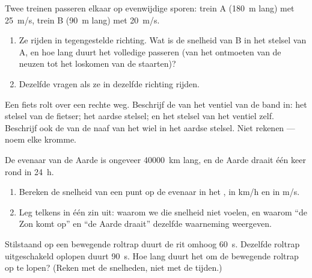 \begin{exercise}[$\star\star$]\label{exo:g10:relative-motion:8}
Twee treinen passeren elkaar op evenwijdige sporen: trein A
(\qty{180}{m} lang) met \qty{25}{m/s}, trein B (\qty{90}{m} lang) met
\qty{20}{m/s}.
\begin{enumerate}
  \item Ze rijden in tegengestelde richting. Wat is de snelheid van B in
        het stelsel van A, en hoe lang duurt het volledige passeren (van
        het ontmoeten van de neuzen tot het loskomen van de staarten)?
  \item Dezelfde vragen als ze in dezelfde richting rijden.
\end{enumerate}
\end{exercise}

\begin{exercise}[$\star\star$]\label{exo:g10:relative-motion:9}
Een fiets rolt over een rechte weg. Beschrijf de  van het ventiel van
de band in: het stelsel van de fietser; het aardse stelsel; en het
stelsel van het ventiel zelf. Beschrijf ook de  van de naaf van het
wiel in het aardse stelsel. Niet rekenen --- noem elke kromme.
\end{exercise}

\begin{exercise}[$\star\star$]\label{exo:g10:relative-motion:10}
De evenaar van de Aarde is ongeveer \qty{40000}{km} lang, en de Aarde
draait één keer rond in \qty{24}{h}.
\begin{enumerate}
  \item Bereken de snelheid van een punt op de evenaar in het
        , in \unit{km/h} en in \unit{m/s}.
  \item Leg telkens in één zin uit: waarom we die snelheid niet voelen,
        en waarom ``de Zon komt op'' en ``de Aarde draait'' dezelfde
        waarneming weergeven.
\end{enumerate}
\end{exercise}

\begin{exercise}[$\star\star$]\label{exo:g10:relative-motion:11}
Stilstaand op een bewegende roltrap duurt de rit omhoog \qty{60}{s}.
Dezelfde roltrap uitgeschakeld oplopen duurt \qty{90}{s}. Hoe lang duurt
het om de bewegende roltrap op te lopen? (Reken met de snelheden, niet
met de tijden.)
\end{exercise}


